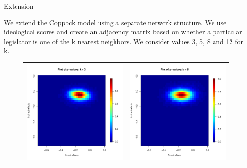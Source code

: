 \documentclass[final]{beamer}
\newlength{\onecolwid}
\newlength{\onecolwidd}
\begin{document}
\begin{frame}[t]
\begin{columns}[t]
\begin{column}{\onecolwidd}
\begin{block}{Extension}
	\begin{rmfamily}
	
	We extend the Coppock model using a separate network structure. We use ideological scores and create an adjacency matrix based on whether a particular legislator is one of the k nearest neighbors. We consider values 3, 5, 8 and 12 for k.
	
	\hspace{2cm}
	\begin{figure}
	\centering
	\begin{tabular}{cc}
	\includegraphics[scale=0.8]{pvalues_figure_3nn.pdf} &
	\includegraphics[scale=0.8]{pvalues_figure_5nn.pdf} \\ 

\end{tabular}
\end{figure}
\end{rmfamily}
\end{block}
\end{column}
\end{columns}
\end{frame}
\end{document}
